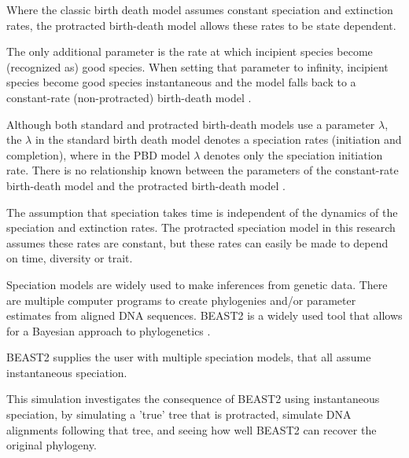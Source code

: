 \documentclass{article}
\begin{document}


Where the classic birth death model assumes constant speciation and extinction
 rates, the protracted birth-death model allows these rates to be state
 dependent.

The only additional parameter is the rate at which incipient species become
(recognized as) good species.
When setting that parameter to infinity, incipient species become good
species instantaneous and the model falls back to a constant-rate (non-protracted) 
birth-death model .


Although both standard and protracted birth-death models use a parameter 
$\lambda$, the $\lambda$ in the standard birth death model denotes
a speciation rates (initiation and completion), where in the PBD model
$\lambda$ denotes only the speciation initiation rate. 
There is no relationship known between the parameters of the constant-rate
birth-death model and the protracted birth-death model \cite{etienne2014estimating} 
.


The assumption that speciation takes time is independent of the dynamics
of the speciation and extinction rates.
The protracted speciation model in this research assumes these rates are
constant, but these rates can easily be made to depend on time, diversity
or trait.


Speciation models are widely used to make inferences from genetic data.
There are multiple computer programs to create phylogenies and/or parameter
estimates from aligned DNA sequences.
BEAST2 is a widely used tool that allows for a Bayesian approach to 
phylogenetics \cite{bouckaert2014beast}.

BEAST2 supplies the user with multiple speciation models, that all assume
instantaneous speciation.
 

This simulation investigates the consequence of BEAST2 using instantaneous
speciation, by simulating a 'true' tree that is protracted, simulate DNA
alignments following that tree, and seeing how well BEAST2 can recover
the original phylogeny.
 
\end{document}
